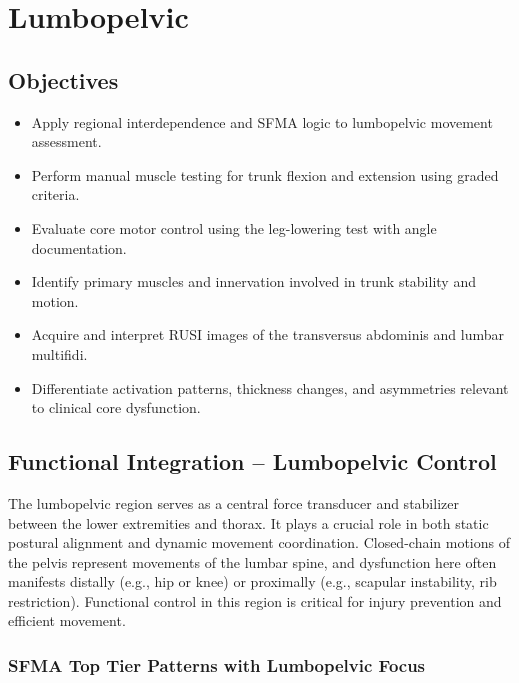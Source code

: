 \chapter{Lumbopelvic}\label{chp:lumbopelvic}

\section*{Objectives}
\begin{itemize}
  \item Apply regional interdependence and SFMA logic to lumbopelvic movement assessment.
  \item Perform manual muscle testing for trunk flexion and extension using graded criteria.
  \item Evaluate core motor control using the leg-lowering test with angle documentation.
  \item Identify primary muscles and innervation involved in trunk stability and motion.
  \item Acquire and interpret RUSI images of the transversus abdominis and lumbar multifidi.
  \item Differentiate activation patterns, thickness changes, and asymmetries relevant to clinical core dysfunction.
\end{itemize}

\section*{Functional Integration – Lumbopelvic Control}

The lumbopelvic region serves as a central force transducer and stabilizer between the lower extremities and thorax. It plays a crucial role in both static postural alignment and dynamic movement coordination. Closed-chain motions of the pelvis represent movements of the lumbar spine, and dysfunction here often manifests distally (e.g., hip or knee) or proximally (e.g., scapular instability, rib restriction). Functional control in this region is critical for injury prevention and efficient movement.

\subsection*{SFMA Top Tier Patterns with Lumbopelvic Focus}

